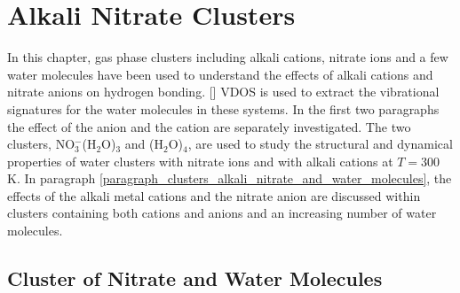   \chapter{Alkali Nitrate Clusters}\label{CHAPTER_results_clusters}
  In this chapter, gas phase clusters including alkali cations, nitrate ions and a few water molecules have been used to understand the
  effects of alkali cations and nitrate anions on hydrogen
  bonding. [\cite{jiangling2010,heine2015}] 
  VDOS is used to extract the vibrational signatures for the water molecules in these systems.
  In the first two paragraphs the effect of the anion and the cation are separately investigated. 
  The two clusters, NO$_3^-$(H$_2$O)$_3$ and \li(H$_2$O)$_4$, are used 
  to study the structural and dynamical properties of water clusters with nitrate ions and with alkali cations at $T= 300$ K. 
  In paragraph \ref{paragraph_clusters_alkali_nitrate_and_water_molecules}, the effects of the alkali metal cations 
  and the nitrate anion are discussed within clusters containing both cations and anions and an increasing number of water molecules.
  \section{Cluster of Nitrate and Water Molecules}\label{paragraph_3w_nitrate}
  
